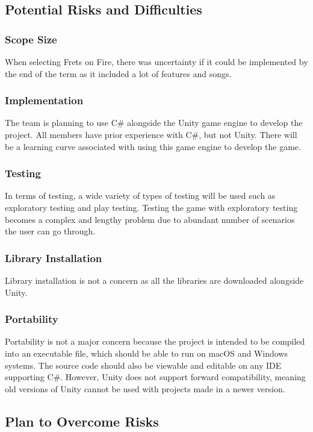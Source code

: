 \documentclass[12pt,letterpaper]{article}
\begin{document}
\subsection{Potential Risks and Difficulties}

\subsubsection{Scope Size}
When selecting Frets on Fire, there was uncertainty if it could be implemented by the end of the term as it included a lot of features and songs.

\subsubsection{Implementation}
The team is planning to use C\# alongside the Unity game engine to develop the project. All members have prior experience with C\#, but not Unity. There will be a learning curve associated with using this game engine to develop the game.

\subsubsection{Testing}
In terms of testing, a wide variety of types of testing will be used such as exploratory testing and play testing. Testing the game with exploratory testing becomes a complex and lengthy problem due to abundant number of scenarios the user can go through. 

\subsubsection{Library Installation}
Library installation is not a concern as all the libraries are downloaded alongside Unity.

\subsubsection{Portability}
Portability is not a major concern because the project is intended to be compiled into an executable file, which should be able to run on macOS and Windows systems. The source code should also be viewable and editable on any IDE supporting C\#. However, Unity does not support forward compatibility, meaning old versions of Unity cannot be used with projects made in a newer version.

\subsection{Plan to Overcome Risks}
\end{document}
